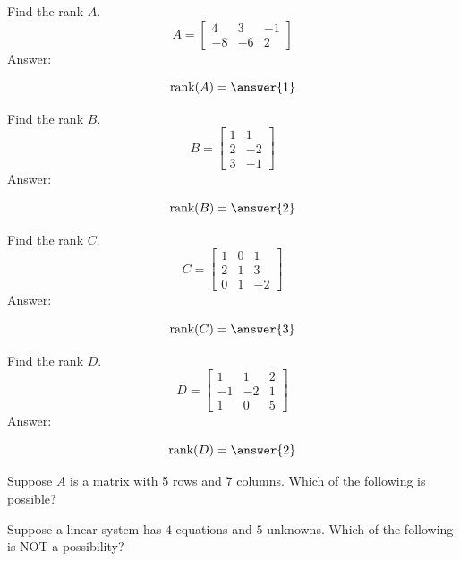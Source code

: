 \documentclass{ximera}
\begin{document}
\begin{problem}\label{prob:rankofmat1}
Find the rank $A$.
$$A=\begin{bmatrix}4&3&-1\\-8&-6&2\end{bmatrix}$$
Answer:

$$\mbox{rank}(A)=\answer{1}$$
\end{problem}

\begin{problem}\label{prob:rankofmat2}
Find the rank $B$.
$$B=\begin{bmatrix}1&1\\2&-2\\3&-1\end{bmatrix}$$
Answer:

$$\mbox{rank}(B)=\answer{2}$$
\end{problem}

\begin{problem}\label{prob:rankofmat3}
Find the rank $C$.
$$C=\begin{bmatrix}1&0&1\\2&1&3\\0&1&-2\end{bmatrix}$$
Answer:

$$\mbox{rank}(C)=\answer{3}$$
\end{problem}

\begin{problem}\label{prob:rankofmat4}
Find the rank $D$.
$$D=\begin{bmatrix}1&1&2\\-1&-2&1\\1&0&5\end{bmatrix}$$
Answer:

$$\mbox{rank}(D)=\answer{2}$$
\end{problem}


\begin{problem}\label{prob:rankofmat5}
Suppose $A$ is a matrix with 5 rows and 7 columns.  Which of the following is possible?
\begin{selectAll}
 \end{selectAll}
\end{problem}

\begin{problem}\label{prob:4eq5un}
Suppose a linear system has $4$ equations and $5$ unknowns.  Which of the following is NOT a possibility?
\begin{multipleChoice}
 \end{multipleChoice}
\end{problem}
\end{document}
